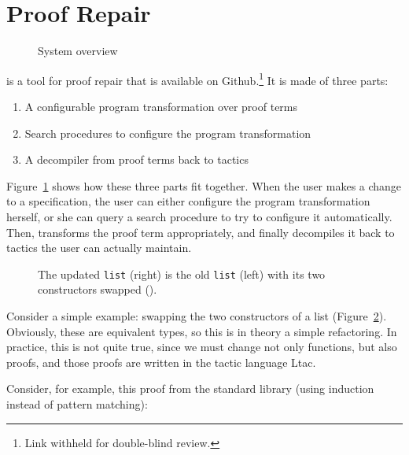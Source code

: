 \section{Proof Repair}
\label{sec:overview}

\begin{figure}
\caption{System overview}
\label{fig:system}
\end{figure}

\toolname is a tool for proof repair that is available on Github.\footnote{Link withheld for double-blind review.}
It is made of three parts:

\begin{enumerate}
\item A configurable program transformation over proof terms
\item Search procedures to configure the program transformation %
\item A decompiler from proof terms back to tactics
\end{enumerate}
Figure~\ref{fig:system} shows how these three parts fit together.
When the user makes a change to a specification,
the user can either configure the program transformation herself, or she can
query a search procedure to try to configure it automatically.
Then, \toolname transforms the proof term appropriately, and finally
decompiles it back to tactics the user can actually maintain.

\begin{figure}
\begin{minipage}{0.46\textwidth}
   
\end{minipage}
\hfill
\begin{minipage}{0.46\textwidth}
   
\end{minipage}
\caption{The updated \lstinline{list} (right) is the old \lstinline{list} (left) with its two constructors swapped ().}
\label{fig:listswap}
\end{figure}

Consider a simple example: swapping the two constructors of a list (Figure~\ref{fig:listswap}).
Obviously, these are equivalent types, so this is in theory a simple refactoring.
In practice, this is not quite true, since we must change not only functions, but also proofs,
and those proofs are written in the tactic language Ltac.

Consider, for example, this proof from the standard library (using induction instead of pattern matching): %

